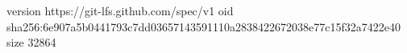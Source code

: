 version https://git-lfs.github.com/spec/v1
oid sha256:6e907a5b0441793c7dd03657143591110a2838422672038e77c15f32a7422e40
size 32864

